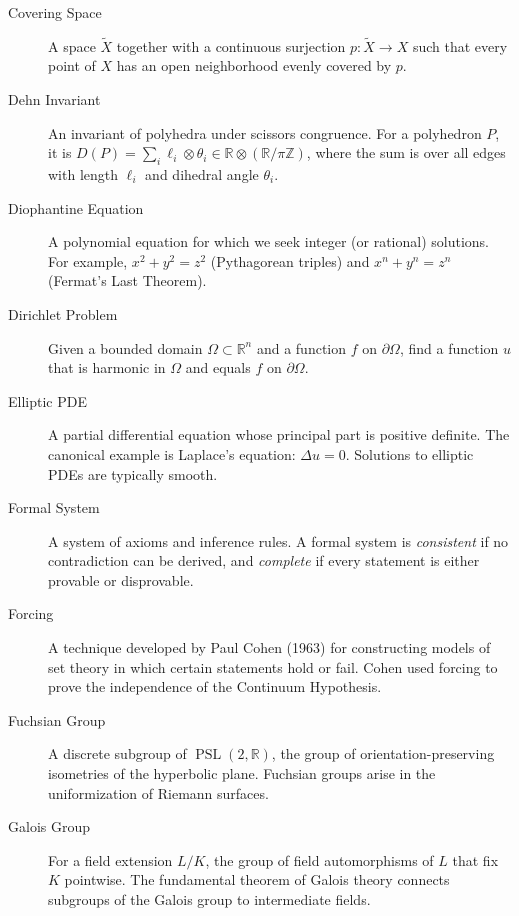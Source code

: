 \begin{description}
    \item[Covering Space] A space $\tilde{X}$ together with a continuous surjection $p: \tilde{X} \to X$ such that every point of $X$ has an open neighborhood evenly covered by $p$.

    \item[Dehn Invariant] An invariant of polyhedra under scissors congruence. For a polyhedron $P$, it is $D(P) = \sum_i \ell_i \otimes \theta_i \in \mathbb{R} \otimes (\mathbb{R}/\pi\mathbb{Z})$, where the sum is over all edges with length $\ell_i$ and dihedral angle $\theta_i$.

    \item[Diophantine Equation] A polynomial equation for which we seek integer (or rational) solutions. For example, $x^2 + y^2 = z^2$ (Pythagorean triples) and $x^n + y^n = z^n$ (Fermat's Last Theorem).

    \item[Dirichlet Problem] Given a bounded domain $\Omega \subset \mathbb{R}^n$ and a function $f$ on $\partial\Omega$, find a function $u$ that is harmonic in $\Omega$ and equals $f$ on $\partial\Omega$.

    \item[Elliptic PDE] A partial differential equation whose principal part is positive definite. The canonical example is Laplace's equation: $\Delta u = 0$. Solutions to elliptic PDEs are typically smooth.

    \item[Formal System] A system of axioms and inference rules. A formal system is \textit{consistent} if no contradiction can be derived, and \textit{complete} if every statement is either provable or disprovable.

    \item[Forcing] A technique developed by Paul Cohen (1963) for constructing models of set theory in which certain statements hold or fail. Cohen used forcing to prove the independence of the Continuum Hypothesis.

    \item[Fuchsian Group] A discrete subgroup of $\operatorname{PSL}(2, \mathbb{R})$, the group of orientation-preserving isometries of the hyperbolic plane. Fuchsian groups arise in the uniformization of Riemann surfaces.

    \item[Galois Group] For a field extension $L/K$, the group of field automorphisms of $L$ that fix $K$ pointwise. The fundamental theorem of Galois theory connects subgroups of the Galois group to intermediate fields.


\end{description}
